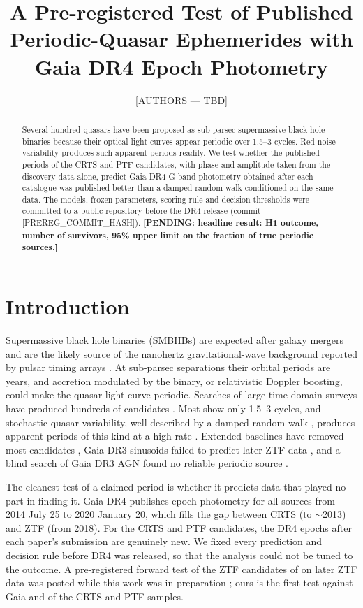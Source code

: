 \documentclass[RNAAS]{aastex631}
\newcommand{\prereghash}{[PREREG\_COMMIT\_HASH]}
\newcommand{\pending}[1]{\textbf{[PENDING: #1]}}
\begin{document}
\title{A Pre-registered Test of Published Periodic-Quasar Ephemerides with Gaia DR4 Epoch Photometry}

\author{[AUTHORS --- TBD]}

\begin{abstract}
Several hundred quasars have been proposed as sub-parsec supermassive black hole binaries
because their optical light curves appear periodic over 1.5--3 cycles. Red-noise
variability produces such apparent periods readily. We test whether the published periods
of the CRTS \citep{Graham2015} and PTF \citep{Charisi2016} candidates, with phase and
amplitude taken from the discovery data alone, predict Gaia DR4 G-band photometry
obtained after each catalogue was published better than a damped random walk conditioned
on the same data. The models, frozen parameters, scoring rule and decision thresholds were
committed to a public repository before the DR4 release (commit \prereghash).
\pending{headline result: H1 outcome, number of survivors, 95\% upper limit on the
fraction of true periodic sources.}
\end{abstract}

\section{Introduction}

Supermassive black hole binaries (SMBHBs) are expected after galaxy mergers and are the
likely source of the nanohertz gravitational-wave background reported by pulsar timing
arrays \citep{NANOGrav2023}. At sub-parsec separations their orbital periods are years,
and accretion modulated by the binary, or relativistic Doppler boosting, could make the
quasar light curve periodic. Searches of large time-domain surveys have produced hundreds
of candidates \citep{Graham2015, Charisi2016, Liu2019, Chen2024, Foustoul2025}. Most show
only 1.5--3 cycles, and stochastic quasar variability, well described by a damped random
walk \citep[DRW;][]{Kelly2009}, produces apparent periods of this kind at a high rate
\citep{Vaughan2016}. Extended baselines have removed most candidates
\citep{Liu2016, Liu2019, Foustoul2025}, Gaia DR3 sinusoids failed to predict later ZTF
data \citep{ElBadry2026}, and a blind search of Gaia DR3 AGN found no reliable periodic
source \citep{Huijse2026}.

The cleanest test of a claimed period is whether it predicts data that played no part in
finding it. Gaia DR4 publishes epoch photometry for all sources from 2014 July 25 to 2020
January 20, which fills the gap between CRTS (to $\sim$2013) and ZTF (from 2018). For the
CRTS and PTF candidates, the DR4 epochs after each paper's submission are genuinely new.
We fixed every prediction and decision rule before DR4 was released, so that the analysis
could not be tuned to the outcome. A pre-registered forward test of the ZTF candidates of
\citet{Chen2024} on later ZTF data was posted while this work was in preparation \citep{Wu2026};
ours is the first test against Gaia and of the CRTS and PTF samples.
\end{document}
